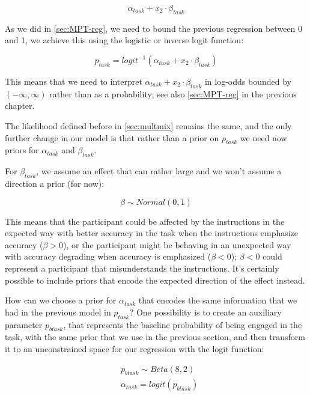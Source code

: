 \documentclass[12pt,]{krantz}
\theoremstyle{definition}
\theoremstyle{definition}
\theoremstyle{definition}
\theoremstyle{remark}
\begin{document}
\begin{equation}
\alpha_{task} + x_2 \cdot \beta_{task}
\end{equation}

As we did in \ref{sec:MPT-reg}, we need to bound the previous regression
between 0 and 1, we achieve this using the logistic or inverse logit
function:

\begin{equation}
p_{task} = logit^{-1}(\alpha_{task} + x_2 \cdot \beta_{task})
\end{equation}

This means that we need to interpret
\(\alpha_{task} + x_2 \cdot \beta_{task}\) in log-odds bounded by
\((-\infty, \infty)\) rather than as a probability; see also
\ref{sec:MPT-reg} in the previous chapter.

The likelihood defined before in \ref{sec:multmix} remains the same, and
the only further change in our model is that rather than a prior on
\(p_{task}\) we need now priors for \(\alpha_{task}\) and
\(\beta_{task}\).

For \(\beta_{task}\), we assume an effect that can rather large and we
won't assume a direction a prior (for now):

\begin{equation}
\beta \sim Normal(0, 1)
\end{equation}

This means that the participant could be affected by the instructions in
the expected way with better accuracy in the task when the instructions
emphasize accuracy (\(\beta >0\)), or the participant might be behaving
in an unexpected way with accuracy degrading when accuracy is emphasized
(\(\beta <0\)); \(\beta <0\) could represent a participant that
misunderstands the instructions. It's certainly possible to include
priors that encode the expected direction of the effect instead.

How can we choose a prior for \(\alpha_{task}\) that encodes the same
information that we had in the previous model in \(p_{task}\)? One
possibility is to create an auxiliary parameter \(p_{btask}\), that
represents the baseline probability of being engaged in the task, with
the same prior that we use in the previous section, and then transform
it to an unconstrained space for our regression with the logit function:

\begin{equation}
\begin{aligned}
&p_{btask} \sim Beta(8, 2)\\
&\alpha_{task} = logit(p_{btask})
\end{aligned}
\end{equation}
\end{document}
